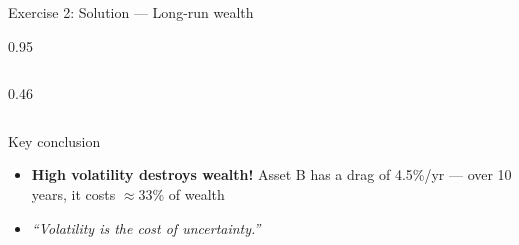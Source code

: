 \documentclass[9pt, aspectratio=169, t]{beamer}
\begin{document}
\begin{frame}[shrink=6]{Exercise 2: Solution --- Long-run wealth}
\begin{cminipage}{0.95\textwidth}
\begin{columns}[T]
\begin{column}{0.46\textwidth}
\begin{center}
    \end{center}
    \end{column}
    \end{columns}
    \vspace{0.1cm}
    \begin{alertblock}{Key conclusion}
    \begin{itemize}\setlength{\itemsep}{0pt}
        \item \textbf{High volatility destroys wealth!} Asset B has a drag of 4.5\%/yr --- over 10 years, it costs $\approx$33\% of wealth
        \item \textit{``Volatility is the cost of uncertainty.''}
    \end{itemize}
    \end{alertblock}
    \end{cminipage}
\end{frame}
\end{document}
